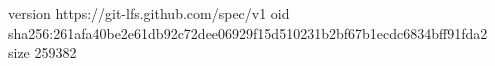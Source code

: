 version https://git-lfs.github.com/spec/v1
oid sha256:261afa40be2e61db92c72dee06929f15d510231b2bf67b1ecdc6834bff91fda2
size 259382
